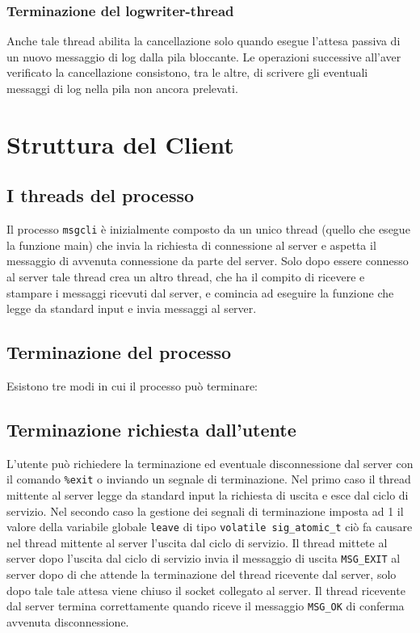 \documentclass[a4paper,10pt]{article}
\begin{document}
\subsubsection{Terminazione del logwriter-thread}
Anche tale thread abilita la cancellazione solo quando esegue l'attesa
passiva di un nuovo messaggio di log dalla pila bloccante. Le
operazioni successive all'aver verificato la cancellazione consistono,
tra le altre, di scrivere gli eventuali messaggi di log nella pila non
ancora prelevati.


\section{Struttura del Client}
\subsection{I threads del processo}
Il processo \texttt{msgcli} \`e inizialmente composto da un unico
thread (quello che esegue la funzione main) che invia la richiesta di
connessione al server e aspetta il messaggio di avvenuta connessione
da parte del server. Solo dopo essere connesso al server tale thread
crea un altro thread, che ha il compito di ricevere e stampare i
messaggi ricevuti dal server, e comincia ad eseguire la funzione che
legge da standard input e invia messaggi al server. 

\subsection{Terminazione del processo}
Esistono tre modi in cui il processo pu\`o terminare:

\subsection*{Terminazione richiesta dall'utente}
L'utente pu\`o richiedere la terminazione ed eventuale disconnessione
dal server con il comando \texttt{\%exit} o inviando un segnale di
terminazione. Nel primo caso il thread mittente al server legge da
standard input la richiesta di uscita e esce dal ciclo di
servizio. Nel secondo caso la gestione dei segnali di terminazione
imposta ad 1 il valore della variabile globale \texttt{leave} di tipo
\texttt{volatile~sig\_atomic\_t} ci\`o fa causare nel thread mittente
al server l'uscita dal ciclo di servizio. Il thread mittete al server
dopo l'uscita dal ciclo di servizio invia il messaggio di uscita
\texttt{MSG\_EXIT} al server dopo di che attende la terminazione del
thread ricevente dal server, solo dopo tale tale attesa viene chiuso
il socket collegato al server. Il thread ricevente dal server termina
correttamente quando riceve il messaggio \texttt{MSG\_OK} di conferma
avvenuta disconnessione. 
\end{document}
